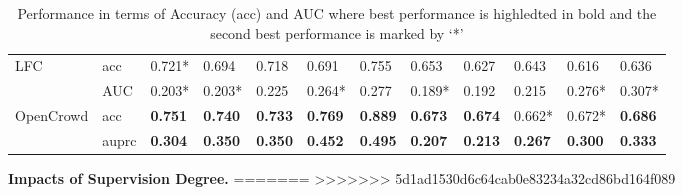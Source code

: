 \begin{table*}[!h]
\begin{tabular}{|l|l|l|l|l|l|l|l|l|l|l|l|}
\multirow{2}{*}{LFC}         & acc     & 0.721*         & 0.694          & 0.718          & 0.691          & 0.755          & 0.653          & 0.627          & 0.643          & 0.616          & 0.636          \\ \cline{2-12} 
                             & AUC   & 0.203*         & 0.203*         & 0.225          & 0.264*         & 0.277          & 0.189*         & 0.192          & 0.215          & 0.276*         & 0.307*         \\ \hline
\multirow{2}{*}{OpenCrowd}   & acc     & \textbf{0.751} & \textbf{0.740} & \textbf{0.733}         & \textbf{0.769} & \textbf{0.889}  & \textbf{0.673} & \textbf{0.674} & 0.662*         & 0.672*         & \textbf{0.686} \\ \cline{2-12} 
                             & auprc   & \textbf{0.304} & \textbf{0.350} & \textbf{0.350} & \textbf{0.452} & \textbf{0.495} & \textbf{0.207} & \textbf{0.213} & \textbf{0.267} & \textbf{0.300} & \textbf{0.333} \\ \hline
\end{tabular}
   \caption{Performance in terms of Accuracy (acc) and AUC where best performance is highledted in bold and the second best performance is marked by `*' }\label{tab:comparision} 
\end{table*}
\label{sec:compres}

\smallskip
\noindent\textbf{Impacts of Supervision Degree.}
=======
>>>>>>> 5d1ad1530d6c64cab0e83234a32cd86bd164f089
